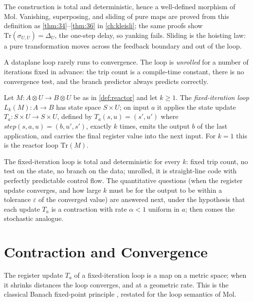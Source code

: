\begin{remark}
The construction is total and deterministic, hence a well-defined morphism of Mol. Vanishing, superposing, and sliding of pure maps are proved from this definition as \autoref{thm:34}--\autoref{thm:36} in \autoref{ch:kleisli}; the same proofs show $\mathrm{Tr} (\sigma_{U,U}) = \Delta_U$, the one-step delay, so yanking fails. Sliding is the hoisting law: a pure transformation moves across the feedback boundary and out of the loop.
\end{remark}

A dataplane loop rarely runs to convergence. The loop is \emph{unrolled} for a number of iterations fixed in advance: the trip count is a compile-time constant, there is no convergence test, and the branch predictor always predicts correctly.

\begin{definition}\label{def:fixed-loop}
Let $M \colon A \otimes U \to B \otimes U$ be as in \autoref{def:reactor} and let $k \geq 1$. The \emph{fixed-iteration loop} $L_k (M) \colon A \to B$ has state space $S \times U$; on input $a$ it applies the state update $T_a \colon S \times U \to S \times U$, defined by $T_a (s,u) = (s',u')$ where $\mathit{step} (s,a,u) = (b,u',s')$, exactly $k$ times, emits the output $b$ of the last application, and carries the final register value into the next input. For $k = 1$ this is the reactor loop $\mathrm{Tr} (M)$.
\end{definition}

\begin{remark}
The fixed-iteration loop is total and deterministic for every $k$: fixed trip count, no test on the state, no branch on the data; unrolled, it is straight-line code with perfectly predictable control flow. The quantitative questions (when the register update converges, and how large $k$ must be for the output to be within a tolerance $\varepsilon$ of the converged value) are answered next, under the hypothesis that each update $T_a$ is a contraction with rate $\alpha < 1$ uniform in $a$; then comes the stochastic analogue.
\end{remark}

\section{Contraction and Convergence}\label{sec:trace-contraction}

The register update $T_a$ of a fixed-iteration loop is a map on a metric space; when it shrinks distances the loop converges, and at a geometric rate. This is the classical Banach fixed-point principle \citep{banach}, restated for the loop semantics of Mol.

